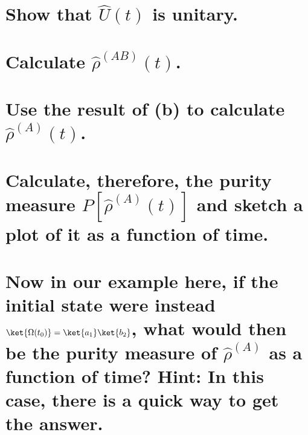 \documentclass[boxes,pages]{homework}
\makeatletter
\numberwithin{@problem}{section}
\makeatother
\begin{document}
\setcounter{section}{14}

\begin{problem}
\begin{parts}
	\part{Show that $\hat{U}(t)$ is unitary.}\label{part:14a}
	\part{Calculate $\hat{\rho}^{(AB)}(t)$.}\label{part:14b}
	\part{Use the result of (b) to calculate $\hat{\rho}^{(A)}(t)$.}\label{part:14c}
	\part{Calculate, therefore, the purity measure $P[\hat{\rho}^{(A)}(t)]$ and sketch a plot of it as a function of time.}\label{part:14d}
	\part{Now in our example here, if the initial state were instead $\ket{\Omega(t_0)} = \ket{a_1}\ket{b_2}$, what would then be the purity measure of $\hat{\rho}^{(A)}$ as a function of time? Hint: In this case, there is a quick way to get the answer.}\label{part:14e}
\end{parts}
\end{problem}
\end{document}
